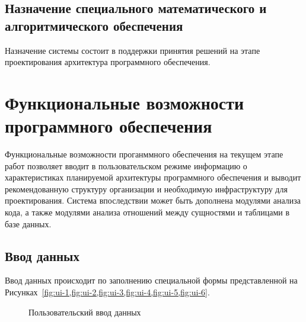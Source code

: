 \subsection{Назначение специального математического и алгоритмического обеспечения}\label{subsec:ch3/sect2/sub1}
Назначение системы состоит в поддержки принятия решений на этапе проектирования архитектура программного обеспечения.

\section{Функциональные возможности программного обеспечения}\label{sec:ch3/sect3}

Функциональные возможности проганммного обеспечения на текущем этапе работ позволяет вводит в пользовательском режиме информацию о характеристиках планируемой архитектуры программного обеспечения и выводит рекомендованную структуру организации и необходимую инфраструктуру для проектирования. Система впоследствии может быть дополнена модулями анализа кода, а также модулями анализа отношений между сущностями и таблицами в базе данных.

\subsection{Ввод данных}\label{subsec:ch3/sect3/sub1}
Ввод данных происходит по заполнению специальной формы представленной на Рисунках~\cref{fig:ui-1,fig:ui-2,fig:ui-3,fig:ui-4,fig:ui-5,fig:ui-6}. 
\begin{figure}[ht]
    \caption{Пользовательский ввод данных}\label{fig:ui-1}
\end{figure}

